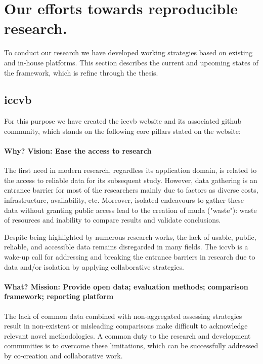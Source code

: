\section{Our efforts towards reproducible research.}
To conduct our research we have developed working strategies based on existing and in-house platforms.
This section describes the current and upcoming states of the framework, which is refine through the thesis.

\subsection{\acs{iccvb}}
For this purpose we have created the \acs{iccvb} website and its associated github community, which stands on the following core pillars stated on the website:

\paragraph{Why? Vision: Ease the access to research}
The first need in modern research, regardless its application domain, is related to the access to reliable data for its subsequent study.
However, data gathering is an entrance barrier for most of the researchers mainly due to factors as diverse costs, infrastructure, availability, etc.
Moreover, isolated endeavours to gather these data without granting public access lead to the creation of muda ("waste"): waste of resources and inability to compare results and validate conclusions.

Despite being highlighted by numerous research works, the lack of usable, public, reliable, and accessible data remains disregarded in many fields.
The \ac{iccvb} is a wake-up call for addressing and breaking the entrance barriers in research due to data and/or isolation by applying collaborative strategies.

\paragraph{What? Mission: Provide open data; evaluation methods; comparison framework; reporting platform}
The lack of common data combined with non-aggregated assessing strategies result in non-existent or misleading comparisons make difficult to acknowledge relevant novel methodologies.
A common duty to the research and development communities is to overcome these limitations, which can be successfully addressed by co-creation and collaborative work.

